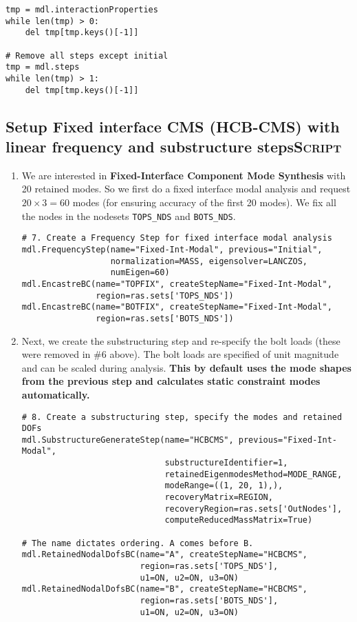 \documentclass[11pt]{article}
\begin{document}
\begin{enumerate}
\begin{verbatim}
tmp = mdl.interactionProperties
while len(tmp) > 0:
    del tmp[tmp.keys()[-1]]

# Remove all steps except initial
tmp = mdl.steps
while len(tmp) > 1:
    del tmp[tmp.keys()[-1]]
\end{verbatim}
\end{enumerate}
\subsection{Setup Fixed interface CMS (HCB-CMS) with linear frequency and substructure steps\hfill{}\textsc{Script}}
\label{sec:orgd758e65}
\begin{enumerate}
\item We are interested in \textbf{Fixed-Interface Component Mode Synthesis} with 20 retained modes.
So we first do a fixed interface modal analysis and request \(20\times3 = 60\) modes (for ensuring accuracy of the first 20 modes).
We fix all the nodes in the nodesets \texttt{TOPS\_NDS} and \texttt{BOTS\_NDS}.
\begin{verbatim}
# 7. Create a Frequency Step for fixed interface modal analysis
mdl.FrequencyStep(name="Fixed-Int-Modal", previous="Initial",
                  normalization=MASS, eigensolver=LANCZOS,
                  numEigen=60)
mdl.EncastreBC(name="TOPFIX", createStepName="Fixed-Int-Modal",
               region=ras.sets['TOPS_NDS'])
mdl.EncastreBC(name="BOTFIX", createStepName="Fixed-Int-Modal",
               region=ras.sets['BOTS_NDS'])
\end{verbatim}
\item Next, we create the substructuring step and re-specify the bolt loads (these were removed in \#6 above).
The bolt loads are specified of unit magnitude and can be scaled during analysis.
\textbf{This by default uses the mode shapes from the previous step and calculates static constraint modes automatically.}
\begin{verbatim}
# 8. Create a substructuring step, specify the modes and retained DOFs
mdl.SubstructureGenerateStep(name="HCBCMS", previous="Fixed-Int-Modal",
                             substructureIdentifier=1, 
                             retainedEigenmodesMethod=MODE_RANGE,
                             modeRange=((1, 20, 1),),
                             recoveryMatrix=REGION,
                             recoveryRegion=ras.sets['OutNodes'],
                             computeReducedMassMatrix=True)

# The name dictates ordering. A comes before B.
mdl.RetainedNodalDofsBC(name="A", createStepName="HCBCMS", 
                        region=ras.sets['TOPS_NDS'], 
                        u1=ON, u2=ON, u3=ON)
mdl.RetainedNodalDofsBC(name="B", createStepName="HCBCMS", 
                        region=ras.sets['BOTS_NDS'], 
                        u1=ON, u2=ON, u3=ON)


\end{verbatim}
\end{enumerate}
\end{document}
